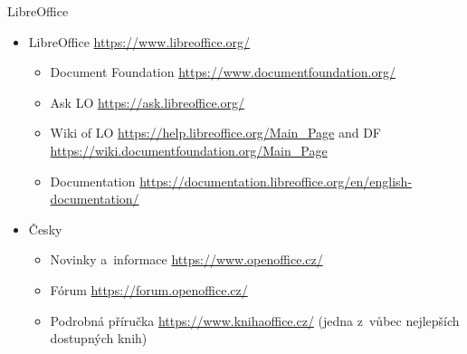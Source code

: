 \documentclass[compress, ucs, xelatex, 11pt, xcolor=svgnames,
  hyperref={
    bookmarks=true,
    unicode=true,
    colorlinks=true,
    pdftitle={Linux, command line and MetaCentrum},
    plainpages=false,
    pdfauthor={Vojtech Zeisek},
    pdfsubject={Course about use of Linux command line, writing shell scripts and using MetaCentrum of CESNET},
    pdfcreator={XeLaTeX},
    pdfkeywords={Linux, GNU, BASH, shell, command line, MetaCentrum},
    linkcolor=DarkRed,
    anchorcolor=DarkBlue,
    citecolor=Indigo,
    filecolor=NavyBlue,
    menucolor=DarkMagenta,
    urlcolor=DarkBlue,
    pdftex},
  url={hyphens, lowtilde} %
  ]{beamer}
\begin{document}
\begin{frame}{LibreOffice}
  \begin{itemize}
    \item LibreOffice \url{https://www.libreoffice.org/}
    \begin{itemize}
      \item Document Foundation \url{https://www.documentfoundation.org/}
      \item Ask LO \url{https://ask.libreoffice.org/}
      \item Wiki of LO \url{https://help.libreoffice.org/Main_Page} and DF \url{https://wiki.documentfoundation.org/Main_Page}
      \item Documentation \url{https://documentation.libreoffice.org/en/english-documentation/}
    \end{itemize}
    \item Česky
    \begin{itemize}
      \item Novinky a~informace \url{https://www.openoffice.cz/}
      \item Fórum \url{https://forum.openoffice.cz/}
      \item Podrobná příručka \url{https://www.knihaoffice.cz/} (jedna z~vůbec nejlepších dostupných knih)
    \end{itemize}
  \end{itemize}
\end{frame}
\end{document}
